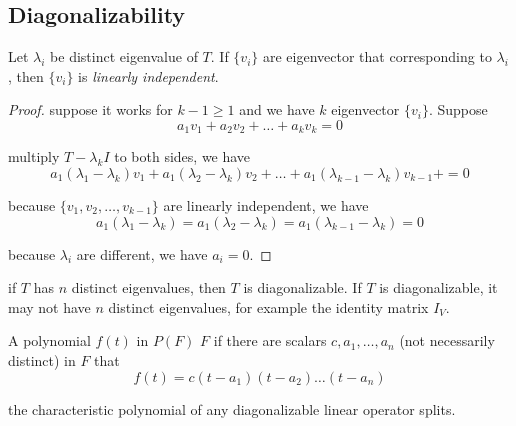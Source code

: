 \subsection{Diagonalizability}


\begin{theorem}
    Let ${\lambda_i}$ be distinct eigenvalue of $T$. If $\{v_i\}$ are eigenvector that corresponding to $\lambda_i$, then $\{v_i\}$ is \emph{linearly independent}.
\end{theorem}
\begin{proof}
    suppose it works for $k - 1 \geq 1$ and we have $k$ eigenvector $\{ v_i\}$. Suppose
    \begin{equation*}
        a_1 v_1 + a_2 v_2 + \dots + a_k v_k = 0
    \end{equation*}
    
    multiply $T - \lambda_k I$ to both sides, we have
    \begin{equation*}
        a_1(\lambda_1 - \lambda_k) v_1 + a_1(\lambda_2 - \lambda_k) v_2 +  \dots + a_1(\lambda_{k-1} - \lambda_k) v_{k-1} +  = 0
    \end{equation*}
    
    because $\{v_1, v_2, \dots, v_{k-1} \}$ are linearly independent, we have 
    \begin{equation*}
        a_1(\lambda_1 - \lambda_k) = a_1(\lambda_2 - \lambda_k) =  a_1(\lambda_{k-1} - \lambda_k) = 0
    \end{equation*}
    
    because $\lambda_i$ are different, we have $a_i = 0$.
\end{proof}

\begin{theorem}
    if $T$ has $n$ distinct eigenvalues, then $T$ is diagonalizable. If $T$ is diagonalizable, it may not have $n$ distinct eigenvalues, for example the identity matrix $I_V$.
\end{theorem}

\begin{definition}
    A polynomial $f(t)$ in $P(F)$  $F$ if there are scalars $c, a_1, \dots, a_n$ (not necessarily distinct) in $F$ that
    \begin{equation*}
        f(t) = c(t - a_1)(t - a_2) \dots (t-a_n)
    \end{equation*}
\end{definition}

\begin{theorem}
    the characteristic polynomial of any diagonalizable linear operator splits.
\end{theorem}

